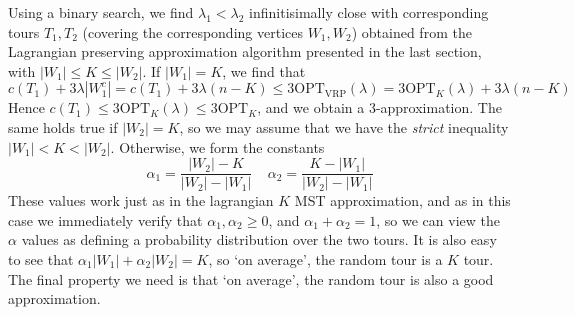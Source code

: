 \documentclass{article}
\theoremstyle{plain}
\theoremstyle{plain}
\begin{document}
Using a binary search, we find $\lambda_1 < \lambda_2$ infinitisimally close with corresponding tours $T_1,T_2$ (covering the corresponding vertices $W_1,W_2$) obtained from the Lagrangian preserving approximation algorithm presented in the last section, with $|W_1| \leq K \leq |W_2|$. If $|W_1| = K$, we find that
%
\[ c(T_1) + 3 \lambda |W_1^c| = c(T_1) + 3 \lambda (n - K) \leq 3 \text{OPT}_{\text{VRP}}(\lambda) = 3 \text{OPT}_K(\lambda) + 3 \lambda(n - K) \]
%
Hence $c(T_1) \leq 3 \text{OPT}_K(\lambda) \leq 3 \text{OPT}_K$, and we obtain a $3$-approximation. The same holds true if $|W_2| = K$, so we may assume that we have the {\it strict} inequality $|W_1| < K < |W_2|$. Otherwise, we form the constants
%
\[ \alpha_1 = \frac{|W_2| - K}{|W_2| - |W_1|}\ \ \ \ \ \alpha_2 = \frac{K - |W_1|}{|W_2| - |W_1|} \]
%
These values work just as in the lagrangian $K$ MST approximation, and as in this case we immediately verify that $\alpha_1, \alpha_2 \geq 0$, and $\alpha_1 + \alpha_2 = 1$, so we can view the $\alpha$ values as defining a probability distribution over the two tours. It is also easy to see that $\alpha_1 |W_1| + \alpha_2 |W_2| = K$, so `on average', the random tour is a $K$ tour. The final property we need is that `on average', the random tour is also a good approximation.
\end{document}
